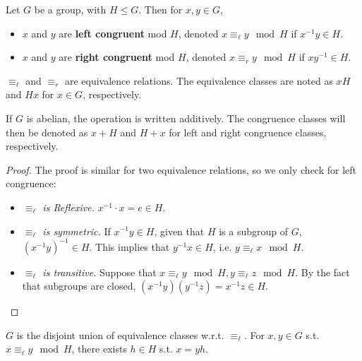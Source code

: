 \begin{definition}
    Let $G$ be a group, with $H \leq G$. Then for $x, y \in G$,
    \begin{itemize}
        \item $x$ and $y$ are \textbf{left congruent} mod $H$, denoted $x \equiv_{\ell} y \mod H$ if $x^{-1}y \in H$.
        \item $x$ and $y$ are \textbf{right congruent} mod $H$, denoted $x \equiv_{r} y \mod H$ if $xy^{-1} \in H$.
    \end{itemize}
\end{definition}

\begin{remark}
    $\equiv_{\ell}$ and $\equiv_r$ are equivalence relations. The equivalence classes are noted as $xH$ and $Hx$ for $x \in G$, respectively.
\end{remark}

\begin{notation}
    If $G$ is abelian, the operation is written additively. The congruence classes will then be denoted as $x + H$ and $H + x$ for left and right congruence classes, respectively.
\end{notation}

\begin{proof}
    The proof is similar for two equivalence relations, so we only check for left congruence:
    \begin{itemize}
        \item \emph{$\equiv_{\ell}$ is Reflexive.} $x^{-1} \cdot x = e \in H$.
        \item \emph{$\equiv_{\ell}$ is symmetric.} If $x^{-1}y \in H$, given that $H$ is a subgroup of $G$, $(x^{-1}y)^{-1} \in H$. This implies that $y^{-1}x \in H$, i.e. $y \equiv_{\ell} x \mod H$.
        \item \emph{$\equiv_{\ell}$ is transitive.} Suppose that $x \equiv_{\ell} y \mod H, y \equiv_{\ell} z \mod H$. By the fact that subgroups are closed, $(x^{-1}y)(y^{-1}z) = x^{-1}z \in H$.
    \end{itemize}
\end{proof}

\begin{remark}\label{rmk: group as disjoint union of cong classes}
    $G$ is the disjoint union of equivalence classes w.r.t. $\equiv_{\ell}$. For $x, y \in G$ s.t. $x \equiv_{\ell} y \mod H$, there exists $h \in H$ s.t. $x = yh$.
\end{remark}

